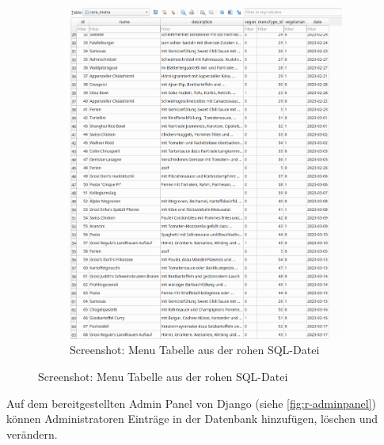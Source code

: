\begin{figure}[htp]
\begin{subfigure}[b]{\textwidth}
        \includegraphics[width=\textwidth]{images/SQL.png}
        \caption{Screenshot: Menu Tabelle aus der rohen SQL-Datei}
        \label{fig:r-SQL-menu}
    \end{subfigure}
\end{figure}

\newpage
Auf dem bereitgestellten Admin Panel von Django (siehe \ref{fig:r-adminpanel})
können Administratoren Einträge in der Datenbank hinzufügen, löschen und
verändern.


